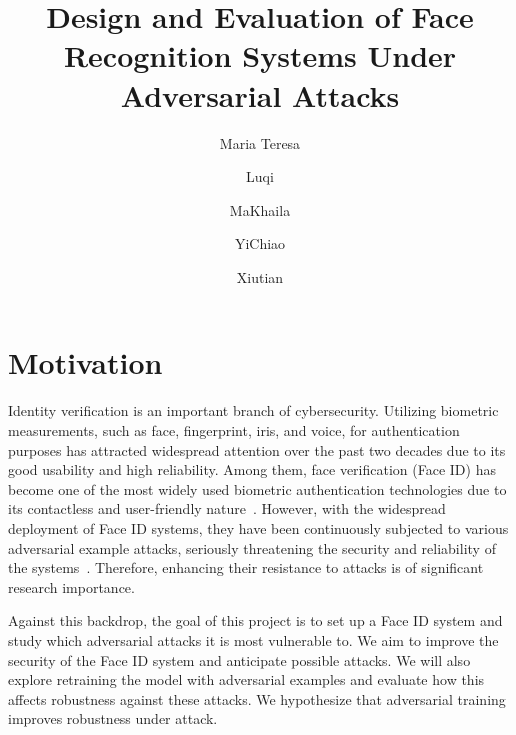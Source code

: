 \documentclass[cameraready]{Interspeech}
\title{Design and Evaluation of Face Recognition Systems Under Adversarial Attacks}
\author[affiliation={1}]{Maria Teresa}{Franco}
\author[affiliation={1}]{Luqi}{Sun}
\author[affiliation={1}]{MaKhaila}{Bentil}
\author[affiliation={1}]{YiChiao}{Wang}
\author[affiliation={1}]{Xiutian}{Zhao}
\begin{document}
\maketitle


\section{Motivation}
Identity verification is an important branch of cybersecurity. Utilizing biometric measurements, such as face, fingerprint, iris, and voice, for authentication purposes has attracted widespread attention over the past two decades due to its good usability and high reliability. Among them, face verification (Face ID) has become one of the most widely used biometric authentication technologies due to its contactless and user-friendly nature~\cite{jha2022face}. However, with the widespread deployment of Face ID systems, they have been continuously subjected to various adversarial example attacks, seriously threatening the security and reliability of the systems~\cite{Sharif2016}. Therefore, enhancing their resistance to attacks is of significant research importance.

Against this backdrop, the goal of this project is to set up a Face ID system and study which adversarial attacks it is most vulnerable to.
We aim to improve the security of the Face ID system and anticipate possible attacks.
We will also explore retraining the model with adversarial examples and evaluate how this affects robustness against these attacks. We hypothesize that adversarial training improves robustness under attack.


\end{document}

